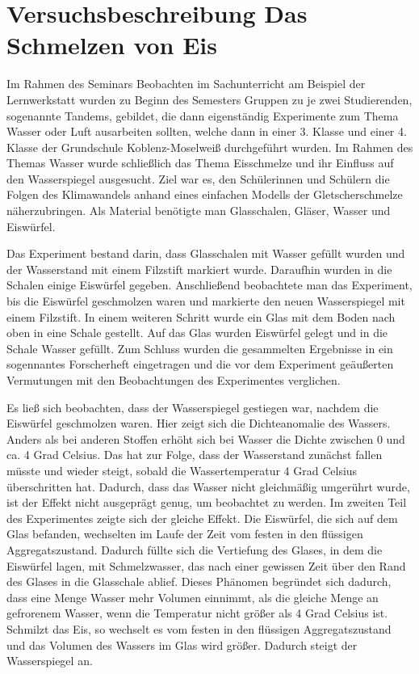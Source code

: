\section{Versuchsbeschreibung \glqq Das Schmelzen von Eis\grqq{}}
Im Rahmen des Seminars \glqq Beobachten im Sachunterricht am Beispiel der Lernwerkstatt\grqq{} wurden zu Beginn des Semesters Gruppen zu je zwei Studierenden, sogenannte Tandems, gebildet, die dann eigenständig Experimente zum Thema \glqq Wasser\grqq{} oder \glqq Luft\grqq{} ausarbeiten sollten, welche dann in einer 3. Klasse und einer 4. Klasse der Grundschule Koblenz-Moselweiß durchgeführt wurden.
Im Rahmen des Themas \glqq Wasser\grqq{} wurde schließlich das Thema \glqq Eisschmelze und ihr Einfluss auf den Wasserspiegel\grqq{} ausgesucht.
Ziel war es, den Schülerinnen und Schülern die Folgen des Klimawandels anhand eines einfachen Modells der Gletscherschmelze näherzubringen.
Als Material benötigte man Glasschalen, Gläser, Wasser und Eiswürfel.

Das Experiment bestand darin, dass Glasschalen mit Wasser gefüllt wurden und der Wasserstand mit einem Filzstift markiert wurde.
Daraufhin wurden in die Schalen einige Eiswürfel gegeben.
Anschließend beobachtete man das Experiment, bis die Eiswürfel geschmolzen waren und markierte den neuen Wasserspiegel mit einem Filzstift.
In einem weiteren Schritt wurde ein Glas mit dem Boden nach oben in eine Schale gestellt.
Auf das Glas wurden Eiswürfel gelegt und in die Schale Wasser gefüllt.
Zum Schluss wurden die gesammelten Ergebnisse in ein sogennantes \glqq Forscherheft\grqq{} eingetragen und die vor dem Experiment geäußerten Vermutungen mit den Beobachtungen des Experimentes verglichen.

Es ließ sich beobachten, dass der Wasserspiegel gestiegen war, nachdem die Eiswürfel geschmolzen waren.
Hier zeigt sich die Dichteanomalie des Wassers.
Anders als bei anderen Stoffen erhöht sich bei Wasser die Dichte zwischen 0 und ca. 4 Grad Celsius.
Das hat zur Folge, dass der Wasserstand zunächst fallen müsste und wieder steigt, sobald die Wassertemperatur 4 Grad Celsius überschritten hat.
Dadurch, dass das Wasser nicht gleichmäßig umgerührt wurde, ist der Effekt nicht ausgeprägt genug, um beobachtet zu werden.
Im zweiten Teil des Experimentes zeigte sich der gleiche Effekt.
Die Eiswürfel, die sich auf dem Glas befanden, wechselten im Laufe der Zeit vom festen in den flüssigen Aggregatszustand.
Dadurch füllte sich die Vertiefung des Glases, in dem die Eiswürfel lagen, mit Schmelzwasser, das nach einer gewissen Zeit über den Rand des Glases in die Glasschale ablief.
Dieses Phänomen begründet sich dadurch, dass eine Menge Wasser mehr Volumen einnimmt, als die gleiche Menge an gefrorenem Wasser, wenn die Temperatur nicht größer als 4 Grad Celsius ist.
Schmilzt das Eis, so wechselt es vom festen in den flüssigen Aggregatszustand und das Volumen des Wassers im Glas wird größer.
Dadurch steigt der Wasserspiegel an.


